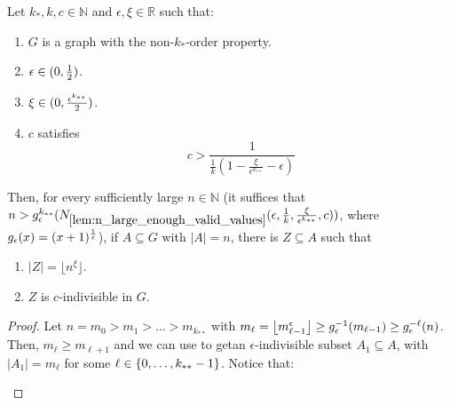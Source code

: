    \begin{lemma}[Claim 4.21] \label{lem:many_values_to_equitative_partition_with_bound_exceptional_pairs}
        Let $k_*, k, c \in \mathbb{N}$ and $\epsilon, \xi \in \mathbb{R}$ such that:
        \begin{enumerate}
            \item\label{itm:many_values_to_equitative_partition_with_bound_exceptional_pairs.1} $G$ is a graph with the non-$k_*$-order property.
            \item\label{itm:many_values_to_equitative_partition_with_bound_exceptional_pairs.2} $\epsilon \in ( 0, \frac{1}{2} )$.
            \item\label{itm:many_values_to_equitative_partition_with_bound_exceptional_pairs.3} $\xi \in ( 0, \frac{\epsilon^{k_{**}}}{2} )$.
            \item\label{itm:many_values_to_equitative_partition_with_bound_exceptional_pairs.4} $c$ satisfies \[
                c > \frac{1}{\frac{1}{k} (1 - \frac{\xi}{\epsilon^{k_{**}}} - \epsilon)}
            \]
        \end{enumerate}
        Then, for every sufficiently large $n \in \mathbb{N}$ (it suffices that $n >
        g_\epsilon^{k_{**}}( N_{\ref{lem:n_large_enough_valid_values}}( \epsilon, \frac{1}{k}, \frac{\xi}{\epsilon^{k_{**}}}, c ) )$,
        where $g_\epsilon(x) = ( x+1 )^{\frac{1}{\epsilon}}$),
        if $A \subseteq G$ with $|A| = n$, there is $Z \subseteq A$ such that
        \begin{enumerate}[label=(\alph*), ref=\alph*]
            \item\label{itm:many_values_to_equitative_partition_with_bound_exceptional_pairs.a} $|Z| = \lfloor n^\xi \rfloor$.
            \item\label{itm:many_values_to_equitative_partition_with_bound_exceptional_pairs.b} $Z$ is $c$-indivisible in $G$.
        \end{enumerate}
        \begin{proof}
            Let $n = m_0 > m_1 > \dots > m_{k_{**}}$ with $m_\ell = \left\lfloor m_{\ell-1}^\epsilon \right\rfloor \geq g_\epsilon^{-1}(m_{\ell-1}) \geq g_\epsilon^{-\ell}(n)$.
            Then, $m_\ell \geq m_{\ell+1}$ and we can use 
            to getan $\epsilon$-indivisible subset $A_1 \subseteq A$, with $|A_1| = m_\ell$ for some $\ell \in \{ 0, \dots, k_{**}-1 \}$.
            Notice that:
            \begin{itemize}

\end{itemize}
\end{proof}
\end{lemma}
